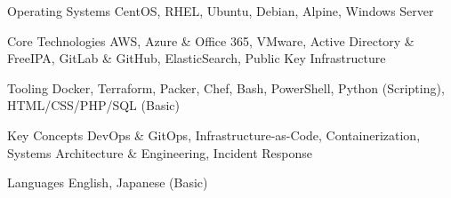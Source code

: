 


\begin{cvskills}


\cvskill
{Operating Systems} %
{CentOS, RHEL, Ubuntu, Debian, Alpine, Windows Server} %


\cvskill
{Core Technologies} %
{AWS, Azure \& Office 365, VMware, Active Directory \& FreeIPA, GitLab \& GitHub, ElasticSearch, Public Key Infrastructure} %


\cvskill
{Tooling} %
{Docker, Terraform, Packer, Chef, Bash, PowerShell, Python (Scripting), HTML/CSS/PHP/SQL (Basic)} %


\cvskill
{Key Concepts} %
{DevOps \& GitOps, Infrastructure-as-Code, Containerization, Systems Architecture \& Engineering, Incident Response} %


\cvskill
{Languages} %
{English, Japanese (Basic)} %


\end{cvskills}
